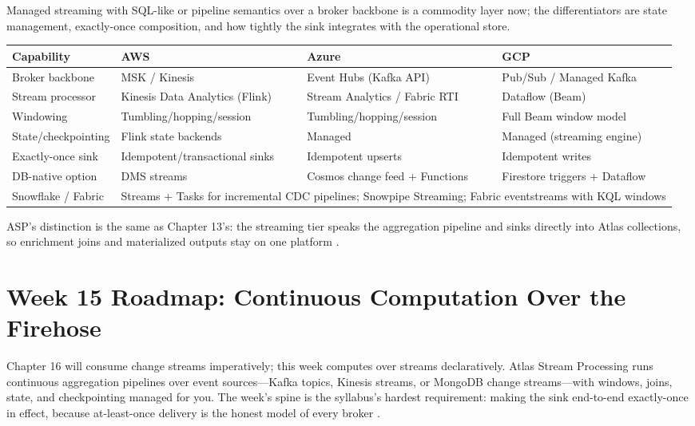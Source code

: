 \begin{crosscloud}
Managed streaming with SQL-like or pipeline semantics over a broker backbone is a commodity layer now; the differentiators are state management, exactly-once composition, and how tightly the sink integrates with the operational store.

\vspace{2mm}
{\footnotesize
\begin{tabular}{@{}p{2.9cm}p{3.0cm}p{3.0cm}p{3.0cm}@{}} 
\toprule
\textbf{Capability} & \textbf{AWS} & \textbf{Azure} & \textbf{GCP} \\
\midrule
Broker backbone & MSK / Kinesis & Event Hubs (Kafka API) & Pub/Sub / Managed Kafka \\
Stream processor & Kinesis Data Analytics (Flink) & Stream Analytics / Fabric RTI & Dataflow (Beam) \\
Windowing & Tumbling/hopping/session & Tumbling/hopping/session & Full Beam window model \\
State/checkpointing & Flink state backends & Managed & Managed (streaming engine) \\
Exactly-once sink & Idempotent/transactional sinks & Idempotent upserts & Idempotent writes \\
DB-native option & DMS streams & Cosmos change feed + Functions & Firestore triggers + Dataflow \\
\addlinespace
Snowflake / Fabric & \multicolumn{3}{l}{Streams + Tasks for incremental CDC pipelines; Snowpipe Streaming; Fabric eventstreams with KQL windows} \\
\bottomrule
\end{tabular}}

\vspace{1mm}
ASP's distinction is the same as Chapter 13's: the streaming tier speaks the aggregation pipeline and sinks directly into Atlas collections, so enrichment joins and materialized outputs stay on one platform \cite{mongodbStreamProcessingDocs,apacheKafkaRepo}.
\end{crosscloud}

\section{Week 15 Roadmap: Continuous Computation Over the Firehose}
Chapter 16 will consume change streams imperatively; this week computes over streams declaratively. Atlas Stream Processing runs continuous aggregation pipelines over event sources---Kafka topics, Kinesis streams, or MongoDB change streams---with windows, joins, state, and checkpointing managed for you. The week's spine is the syllabus's hardest requirement: making the sink end-to-end exactly-once in effect, because at-least-once delivery is the honest model of every broker \cite{mongodbStreamProcessingDocs,kleppmann2017ddia}.

